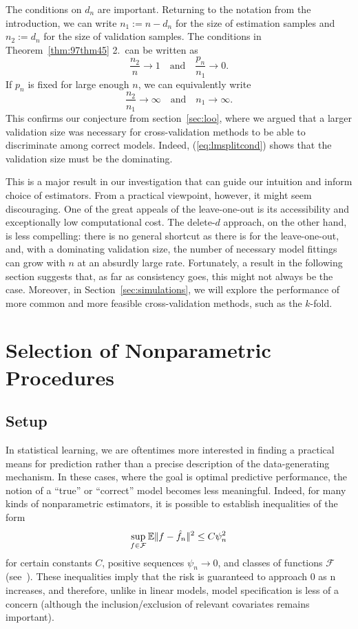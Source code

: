 \documentclass[11pt, letter paper]{article}
\newcommand{\1}{\mathmybb{1}}
\newcommand{\0}{\emptyset}
\newcommand{\E}{\mathbb{E}}
\newcommand{\paren}[1]{\left(#1 \right)}
\newcommand{\norm}[1]{|\hspace{-1pt}|#1 |\hspace{-1pt}|}
\newcommand{\normsq}[1]{\norm{#1}^{2}}
\newcommand{\Fcal}{\mathcal{F}}
\begin{document}
The conditions on \(d_{n}\) are important. Returning to the notation from the introduction, we can write \(n_{1}:=n-d_{n}\) for the size of estimation samples and \(n_{2}:=d_{n}\) for the size of validation samples. The conditions in Theorem~\ref{thm:97thm45} 2.\ can be written as 
\[\frac{n_{2}}{n}\to 1\quad\text{and}\quad \frac{p_{n}}{n_{1}}\to 0.\]
If \(p_{n}\) is fixed for large enough \(n\), we can equivalently write
\begin{equation}\label{eq:lmsplitcond}
    \frac{n_{2}}{n_{1}}\to\infty\quad\text{and}\quad n_{1}\to \infty.
\end{equation}
This confirms our conjecture from section~{\ref{sec:loo}}, where we argued that a larger validation size was necessary for cross-validation methods to be able to discriminate among correct models. Indeed, (\ref{eq:lmsplitcond}) shows that the validation size must be the dominating.

This is a major result in our investigation that can guide our intuition and inform choice of estimators. From a practical viewpoint, however, it might seem discouraging. One of the great appeals of the leave-one-out is its accessibility and exceptionally low computational cost. The delete-\(d\) approach, on the other hand, is less compelling: there is no general shortcut as there is for the leave-one-out, and, with a dominating validation size, the number of necessary model fittings can grow with \(n\) at an absurdly large rate. Fortunately, a result in the following section suggests that, as far as consistency goes, this might not always be the case. Moreover, in Section~\ref{sec:simulations}, we will explore the performance of more common and more feasible cross-validation methods, such as the \(k\)-fold.



\section{Selection of Nonparametric Procedures}\label{sec:yang}

\subsection{Setup}

In statistical learning, we are oftentimes more interested in finding a practical means for prediction rather than a precise description of the data-generating mechanism. In these cases, where the goal is optimal predictive performance, the notion of a ``true'' or ``correct'' model becomes less meaningful. Indeed, for many kinds of nonparametric estimators, it is possible to establish inequalities of the form
\[\sup_{f\in\Fcal}\E{\normsq{f - \hat{f}_{n}}} \leq C\psi_{n}^{2}\]
for certain constants \(C\), positive sequences \(\psi_{n}\to 0\), and classes of functions \(\Fcal\) (see~\cite{tsybakov_introduction_2009}). These inequalities imply that the risk is guaranteed to approach 0 as n increases, and therefore, unlike in linear models, model specification is less of a concern (although the inclusion/exclusion of relevant covariates remains important). 
\end{document}
